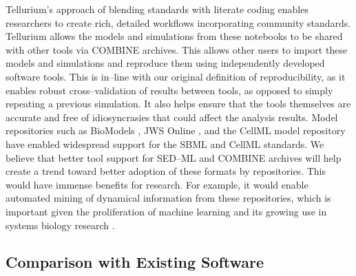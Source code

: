 \documentclass[10pt,letterpaper]{article}
\begin{document}
Tellurium's approach of blending standards with literate coding enables researchers to create rich, detailed workflows incorporating community standards. Tellurium allows the models and simulations from these notebooks to be shared with other tools via COMBINE archives. This allows other users to import these models and simulations and reproduce them using independently developed software tools. This is in--line with our original definition of reproducibility, as it enables robust cross--validation of results between tools, as opposed to simply repeating a previous simulation. It also helps ensure that the tools themselves are accurate and free of idiosyncrasies that could affect the analysis results. Model repositories such as BioModels \cite{le2006biomodels,li2010biomodels}, JWS Online \cite{olivier2004web}, and the CellML model repository \cite{lloyd2008cellml} have enabled widespread support for the SBML and CellML standards. We believe that better tool support for SED--ML and COMBINE archives will help create a trend toward better adoption of these formats by repositories. This would have immense benefits for research. For example, it would enable automated mining of dynamical information from these repositories, which is important given the proliferation of machine learning and its growing use in systems biology research \cite{angermueller2017deepcpg,jurtz2017deeplearning}.

\subsection*{Comparison with Existing Software}
\end{document}
